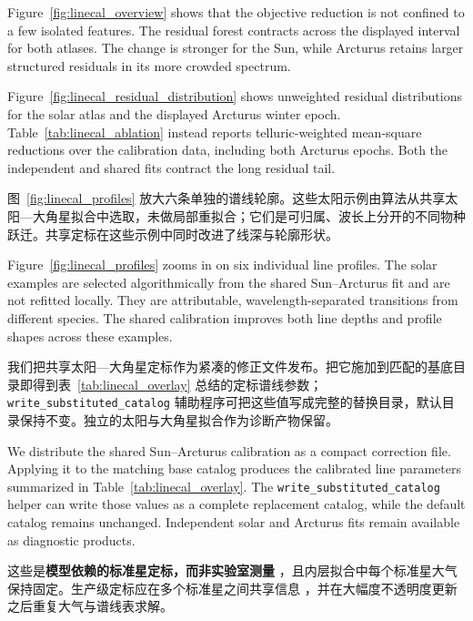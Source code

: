 \begin{EN}
Figure~\ref{fig:linecal_overview} shows that the objective reduction is not
confined to a few isolated features. The residual forest contracts across the
displayed interval for both atlases. The change is stronger for the Sun, while
Arcturus retains larger structured residuals in its more crowded spectrum.

Figure~\ref{fig:linecal_residual_distribution} shows unweighted residual
distributions for the solar atlas and the displayed Arcturus winter epoch.
Table~\ref{tab:linecal_ablation} instead reports telluric-weighted mean-square
reductions over the calibration data, including both Arcturus epochs. Both the
independent and shared fits contract the long residual tail.
\end{EN}

图~\ref{fig:linecal_profiles} 放大六条单独的谱线轮廓。这些太阳示例由算法从共享太阳—大角星拟合中选取，未做局部重拟合；它们是可归属、波长上分开的不同物种跃迁。共享定标在这些示例中同时改进了线深与轮廓形状。

\begin{EN}
Figure~\ref{fig:linecal_profiles} zooms in on six individual line profiles. The
solar examples are selected algorithmically from the
shared Sun--Arcturus fit and are not refitted locally. They are attributable,
wavelength-separated transitions from different species. The shared
calibration improves both line depths and profile shapes across these examples.
\end{EN}

我们把共享太阳—大角星定标作为紧凑的修正文件发布。把它施加到匹配的基底目录即得到表~\ref{tab:linecal_overlay} 总结的定标谱线参数；\texttt{write\_substituted\_catalog} 辅助程序可把这些值写成完整的替换目录，默认目录保持不变。独立的太阳与大角星拟合作为诊断产物保留。

\begin{EN}
We distribute the shared Sun--Arcturus calibration as a compact correction
file. Applying it to the matching base catalog produces the calibrated line
parameters summarized in Table~\ref{tab:linecal_overlay}. The
\texttt{write\_substituted\_catalog} helper can write those values as a complete
replacement catalog, while the default catalog remains unchanged. Independent
solar and Arcturus fits remain available as diagnostic products.
\end{EN}

这些是\textbf{模型依赖的标准星定标，而非实验室测量} \citep{Heiter2015,Heiter2021}，且内层拟合中每个标准星大气保持固定。生产级定标应在多个标准星之间共享信息 \citep{Heiter2015,Jofre2015,Smith2021}，并在大幅度不透明度更新之后重复大气与谱线表求解。

